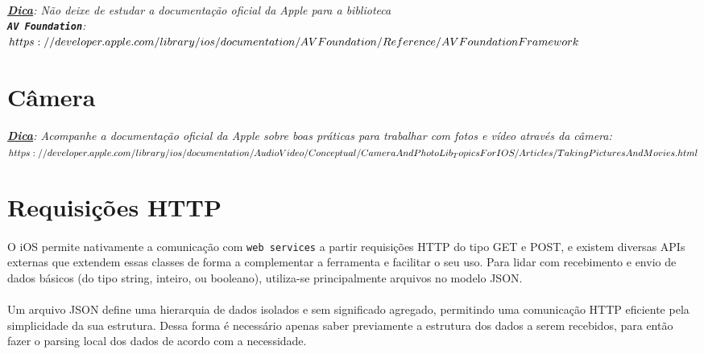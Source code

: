 \documentclass[a4paper,12pt,brazil,doubleside]{book}
\begin{document}
\paragraph{}\textit{\textbf{\underline{Dica}}: Não deixe de estudar a documentação oficial da Apple para a biblioteca\\  \texttt{\textbf{AV Foundation}}:\\
\(https://developer.apple.com/library/ios/documentation/AVFoundation/Reference/\\AVFoundationFramework\)}

\bigskip


\section{Câmera}




\paragraph{}\textit{\textbf{\underline{Dica}}: Acompanhe a documentação oficial da Apple sobre boas práticas para trabalhar com fotos e vídeo através da câmera:\\
\(https://developer.apple.com/library/ios/documentation/AudioVideo/Conceptual/\\CameraAndPhotoLib_TopicsForIOS/Articles/TakingPicturesAndMovies.html\)}

\bigskip


\section{Requisições HTTP}

\paragraph{}O iOS permite nativamente a comunicação com \texttt{web services} a partir requisições HTTP do tipo GET e POST, e existem diversas APIs externas que extendem essas classes de forma a complementar a ferramenta e facilitar o seu uso. Para lidar com recebimento e envio de dados básicos (do tipo string, inteiro, ou booleano), utiliza-se principalmente arquivos no modelo JSON.
\paragraph{}Um arquivo JSON define uma hierarquia de dados isolados e sem significado agregado, permitindo uma comunicação HTTP eficiente pela simplicidade da sua estrutura. Dessa forma é necessário apenas saber previamente a estrutura dos dados a serem recebidos, para então fazer o parsing local dos dados de acordo com a necessidade.
\end{document}
